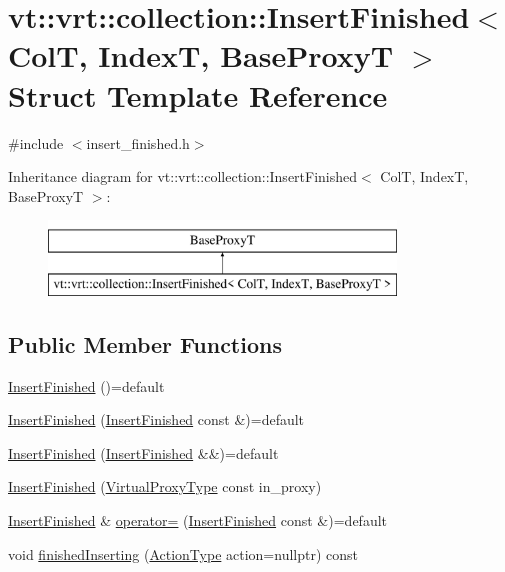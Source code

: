 \hypertarget{structvt_1_1vrt_1_1collection_1_1_insert_finished}{}\section{vt\+:\+:vrt\+:\+:collection\+:\+:Insert\+Finished$<$ ColT, IndexT, Base\+ProxyT $>$ Struct Template Reference}
\label{structvt_1_1vrt_1_1collection_1_1_insert_finished}


{\ttfamily \#include $<$insert\+\_\+finished.\+h$>$}

Inheritance diagram for vt\+:\+:vrt\+:\+:collection\+:\+:Insert\+Finished$<$ ColT, IndexT, Base\+ProxyT $>$\+:\begin{figure}[H]
\begin{center}
\leavevmode
\includegraphics[height=2.000000cm]{structvt_1_1vrt_1_1collection_1_1_insert_finished}
\end{center}
\end{figure}
\subsection*{Public Member Functions}
\begin{DoxyCompactItemize}
\item 
\hyperlink{structvt_1_1vrt_1_1collection_1_1_insert_finished_adfe86c7dc499bf7a395f42f30e3c1147}{Insert\+Finished} ()=default
\item 
\hyperlink{structvt_1_1vrt_1_1collection_1_1_insert_finished_afb46259f654419128600dea6fe4dd5ed}{Insert\+Finished} (\hyperlink{structvt_1_1vrt_1_1collection_1_1_insert_finished}{Insert\+Finished} const \&)=default
\item 
\hyperlink{structvt_1_1vrt_1_1collection_1_1_insert_finished_a0a0bbd5092ce0ee4cc59903e002688d0}{Insert\+Finished} (\hyperlink{structvt_1_1vrt_1_1collection_1_1_insert_finished}{Insert\+Finished} \&\&)=default
\item 
\hyperlink{structvt_1_1vrt_1_1collection_1_1_insert_finished_a55fa81f0804add512dc47cdaa5e6b7db}{Insert\+Finished} (\hyperlink{namespacevt_a1b417dd5d684f045bb58a0ede70045ac}{Virtual\+Proxy\+Type} const in\+\_\+proxy)
\item 
\hyperlink{structvt_1_1vrt_1_1collection_1_1_insert_finished}{Insert\+Finished} \& \hyperlink{structvt_1_1vrt_1_1collection_1_1_insert_finished_a87cd8b63c7dc39be5aedb5840120c562}{operator=} (\hyperlink{structvt_1_1vrt_1_1collection_1_1_insert_finished}{Insert\+Finished} const \&)=default
\item 
void \hyperlink{structvt_1_1vrt_1_1collection_1_1_insert_finished_a2a02b5f07f8e1c62d26ad76c9627189d}{finished\+Inserting} (\hyperlink{namespacevt_ae0a5a7b18cc99d7b732cb4d44f46b0f3}{Action\+Type} action=nullptr) const
\end{DoxyCompactItemize}


